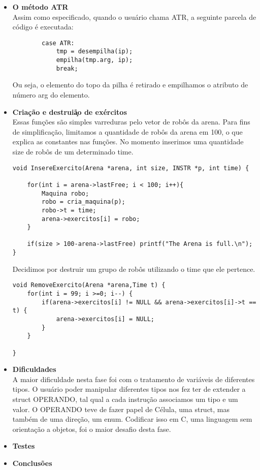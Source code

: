 \documentclass{article}
\begin{document}
\begin{itemize}
    \item \textbf{O m\'etodo ATR} \\
    Assim como especificado, quando o usu\'ario chama ATR, a seguinte parcela de c\'odigo \'e executada:
    \begin{lstlisting}
        case ATR:
			tmp = desempilha(ip);
			empilha(tmp.arg, ip);
			break;
    \end{lstlisting}
    Ou seja, o elemento do topo da pilha \'e retirado e empilhamos o atributo de n\'umero arg do elemento.
    \item \textbf{Cria\c c\~ao e destrui\c \~ao de ex\'ercitos} \\
    Essas fun\c c\~oes s\~ao simples varreduras pelo vetor de rob\^os da arena. Para fins de simplifica\c c\~ao, limitamos a quantidade de rob\^os da arena em 100, o que explica as constantes nas fun\c c\~oes. No momento inserimos uma quantidade size de rob\^os de um determinado time.
    \begin{lstlisting}
void InsereExercito(Arena *arena, int size, INSTR *p, int time) {
	
	for(int i = arena->lastFree; i < 100; i++){
		Maquina robo;
		robo = cria_maquina(p);
		robo->t = time;
		arena->exercitos[i] = robo;
	}

	if(size > 100-arena->lastFree) printf("The Arena is full.\n"); 
}
    \end{lstlisting}
    
    Decidimos por destruir um grupo de rob\^os utilizando o time que ele pertence.
    \begin{lstlisting}
void RemoveExercito(Arena *arena,Time t) {
	for(int i = 99; i >=0; i--) {
		if(arena->exercitos[i] != NULL && arena->exercitos[i]->t == t) {
			arena->exercitos[i] = NULL;
		}
	}
	
}	
    \end{lstlisting}
    
    \item \textbf{Dificuldades} \\
    A maior dificuldade nesta fase foi com o tratamento de vari\'aveis de diferentes tipos. O usu\'ario poder manipular diferentes tipos nos fez ter de extender a struct OPERANDO, tal qual a cada instru\c c\~ao associamos um tipo e um valor. O OPERANDO teve de fazer papel de C\'elula, uma struct, mas tamb\'em de uma dire\c c\~ao, um enum. Codificar isso em C, uma linguagem sem orienta\c c\~ao a objetos, foi o maior desafio desta fase.
    
    \item \textbf{Testes} \\
    
    \item \textbf{Conclus\~oes} \\

\end{itemize}
\end{document}
